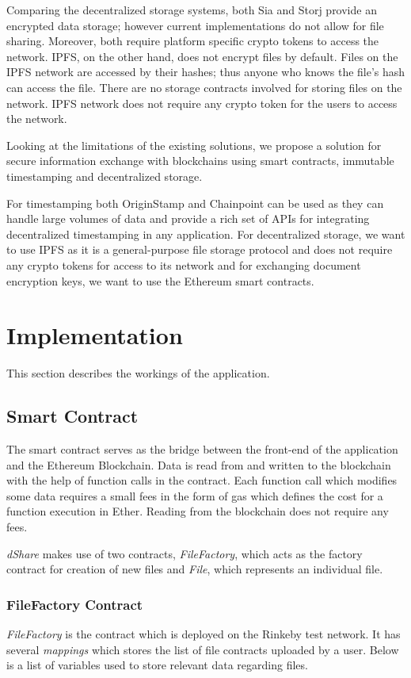 \documentclass[]{article}
\begin{document}
		Comparing the decentralized storage systems, both Sia and Storj provide an encrypted data storage; however current implementations do not allow for file sharing. Moreover, both require platform specific crypto tokens to access the network. IPFS, on the other hand, does not encrypt files by default. Files on the IPFS network are accessed by their hashes; thus anyone who knows the file’s hash can access the file. There are no storage contracts involved for storing files on the network. IPFS network does not require any crypto token for the users to access the network.
		
		Looking at the limitations of the existing solutions, we propose a solution for secure information exchange  with blockchains using smart contracts, immutable timestamping and decentralized storage.
		
		For timestamping both OriginStamp and Chainpoint can be used as they can handle large volumes of data and provide a rich set of APIs for integrating decentralized timestamping in any application. For decentralized storage, we want to use IPFS as it is a general-purpose file storage protocol and does not require any crypto tokens for access to its network and for exchanging document encryption keys, we want to use the Ethereum smart contracts.
	
	\newpage
	\section{Implementation}
		This section describes the workings of the application.
		
		\subsection{Smart Contract}
		The smart contract serves as the bridge between the front-end of the application and the Ethereum Blockchain. Data is read from and written to the blockchain with the help of function calls in the contract. Each function call which modifies some data requires a small fees in the form of gas which defines the cost for a function execution in Ether. Reading from the blockchain does not require any fees.
		
		\textit{dShare} makes use of two contracts, \textit{FileFactory}, which acts as the factory contract for creation of new files and \textit{File}, which represents an individual file.
		
		\subsubsection{FileFactory Contract}
		\textit{FileFactory} is the contract which is deployed on the Rinkeby test network. It has several \textit{mappings} which stores the list of file contracts uploaded by a user. Below is a list of variables used to store relevant data regarding files.
		
\end{document}
